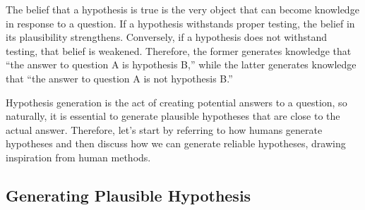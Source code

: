 \documentclass{book}
\begin{document}
The belief that a hypothesis is true is the very object that can become knowledge in response to a question. If a hypothesis withstands proper testing, the belief in its plausibility strengthens. Conversely, if a hypothesis does not withstand testing, that belief is weakened. Therefore, the former generates knowledge that ``the answer to question A is hypothesis B,'' while the latter generates knowledge that ``the answer to question A is not hypothesis B.'' 

Hypothesis generation is the act of creating potential answers to a question, so naturally, it is essential to generate plausible hypotheses that are close to the actual answer. Therefore, let's start by referring to how humans generate hypotheses and then discuss how we can generate reliable hypotheses, drawing inspiration from human methods.

\subsection{Generating Plausible Hypothesis}
\end{document}
